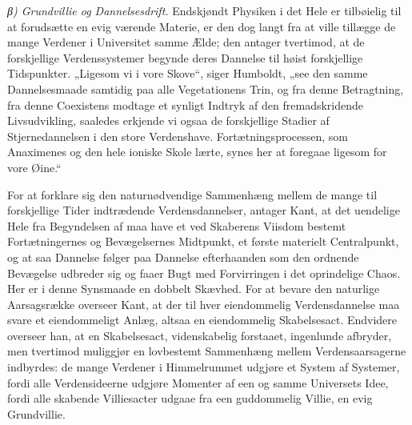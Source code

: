 \documentclass[12pt,a4paper]{book}
\newcommand{\subrunin}[1]{\emph{#1}\hspace{0.4em}}
\begin{document}
\subrunin{β) Grundvillie og Dannelsesdrift.} Endskjøndt Physiken i det Hele er
tilbøielig til at forudsætte en evig
værende Materie, er den dog langt fra at ville tillægge de mange Verdener i
Universitet samme Ælde; den antager tvertimod, at de forskjellige
Verdenssystemer begynde deres Dannelse til høist forskjellige Tidspunkter.
„Ligesom vi i vore Skove“, siger Humboldt, „see den samme Dannelsesmaade
samtidig paa alle Vegetationens Trin, og fra denne Betragtning, fra denne
Coexistens modtage et synligt Indtryk af den fremadskridende Livsudvikling,
saaledes erkjende vi ogsaa de forskjellige Stadier af Stjernedannelsen i den
store Verdenshave. Fortætningsprocessen, som Anaximenes og den hele ioniske
Skole lærte, synes her at foregaae ligesom for vore Øine.“

For at forklare sig den naturnødvendige Sammenhæng mellem de mange til
forskjellige Tider indtrædende Verdensdannelser, antager Kant, at det uendelige
Hele fra Begyndelsen af maa have et ved Skaberens Viisdom bestemt
Fortætningernes og Bevægelsernes Midtpunkt, et første materielt Centralpunkt,
og at saa Dannelse følger paa Dannelse efterhaanden som den ordnende Bevægelse
udbreder sig og faaer Bugt med Forvirringen i det oprindelige Chaos. Her er i
denne Synsmaade en dobbelt Skævhed. For at bevare den naturlige Aarsagsrække
overseer Kant, at der til hver eiendommelig Verdensdannelse maa svare et
eiendommeligt Anlæg, altsaa en eiendommelig Skabelsesact. Endvidere overseer
han, at en Skabelsesact, videnskabelig forstaaet, ingenlunde afbryder, men
tvertimod muliggjør en lovbestemt Sammenhæng mellem Verdensaarsagerne
indbyrdes: de mange Verdener i Himmelrummet udgjøre et System af Systemer,
fordi alle Verdensideerne udgjøre Momenter af een og samme Universets Idee,
fordi alle skabende Villiesacter udgaae fra een guddommelig Villie, en evig
Grundvillie.
\end{document}
